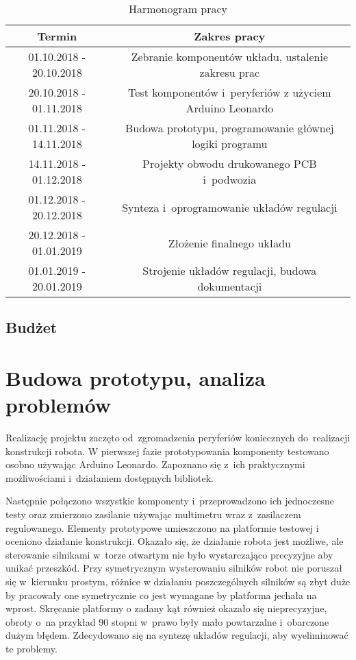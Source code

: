 \documentclass[11pt]{article}
\begin{document}
\begin{table}[hbt]
	\centering
	\begin{tabular}{|c|c|}
	\hline
Termin                  & Zakres pracy                                                                         \\ \hline
01.10.2018 - 20.10.2018 & Zebranie komponentów układu, ustalenie zakresu prac                                  \\ \hline
20.10.2018 - 01.11.2018 & Test komponentów i~peryferiów z użyciem Arduino Leonardo                             \\ \hline
01.11.2018 - 14.11.2018 & Budowa prototypu, programowanie głównej logiki programu \\ \hline
14.11.2018 - 01.12.2018 & Projekty obwodu drukowanego PCB i~podwozia                                           \\ \hline
01.12.2018 - 20.12.2018 & Synteza i~oprogramowanie układów regulacji                                           \\ \hline
20.12.2018 - 01.01.2019 & Złożenie finalnego układu                                                            \\ \hline
01.01.2019 - 20.01.2019 & Strojenie układów regulacji, budowa dokumentacji                                      \\ \hline
	\end{tabular}
	\caption{Harmonogram pracy}
	\label{tab:harmonogram}
\end{table}

\subsection{Budżet}
\section{Budowa prototypu, analiza problemów}
Realizację projektu zaczęto od~zgromadzenia peryferiów koniecznych do~realizacji konstrukcji robota.
W pierwszej fazie prototypowania komponenty testowano osobno używając Arduino Leonardo. Zapoznano się z~ich praktycznymi możliwościami i~działaniem dostępnych bibliotek. 

Następnie połączono wszystkie komponenty i~przeprowadzono ich jednoczesne testy oraz zmierzono zasilanie używając multimetru wraz z~zasilaczem regulowanego.
Elementy prototypowe umieszczono na platformie testowej i oceniono działanie konstrukcji.
Okazało się, że działanie robota jest możliwe, ale sterowanie silnikami w~torze otwartym nie było wystarczająco precyzyjne aby unikać przeszkód. Przy symetrycznym wysterowaniu silników robot nie poruszał się w~kierunku prostym, różnice w działaniu poszczególnych silników są zbyt duże by pracowały one symetrycznie co jest wymagane by platforma jechała na wprost.
Skręcanie platformy o zadany kąt również okazało się nieprecyzyjne, obroty o~na przykład 90 stopni w~prawo były mało powtarzalne i~obarczone dużym błędem. Zdecydowano się na syntezę układów regulacji, aby wyeliminować te problemy.
\end{document}
